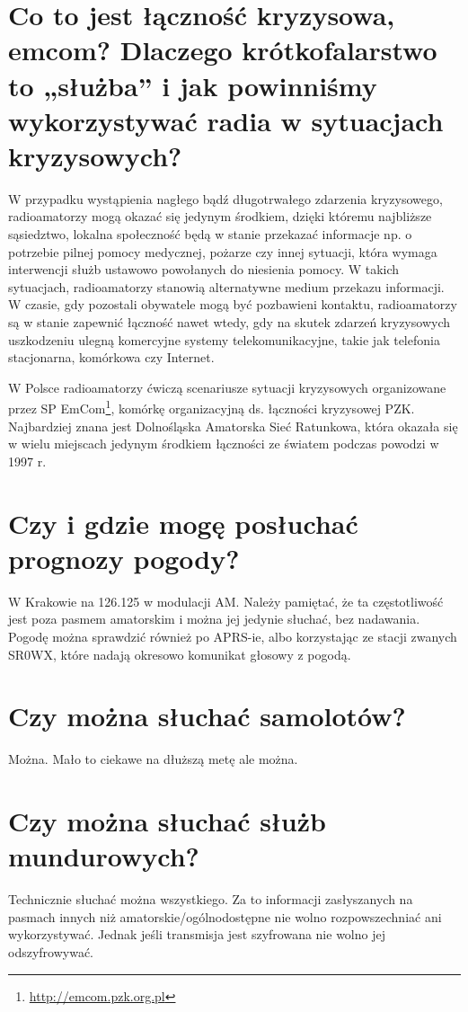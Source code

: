 \documentclass[a4paper,12pt]{article}
\begin{document}
\section{Co to jest łączność kryzysowa, emcom? Dlaczego krótkofalarstwo to „służba” i jak powinniśmy wykorzystywać radia w sytuacjach kryzysowych?}
W przypadku wystąpienia nagłego bądź długotrwałego zdarzenia kryzysowego, radioamatorzy mogą okazać się jedynym środkiem, dzięki któremu najbliższe sąsiedztwo, lokalna społeczność będą w stanie przekazać informacje np. o potrzebie pilnej pomocy medycznej, pożarze czy innej sytuacji, która wymaga interwencji służb ustawowo powołanych do niesienia pomocy. W takich sytuacjach, radioamatorzy stanowią alternatywne medium przekazu informacji. W czasie, gdy pozostali obywatele mogą być pozbawieni kontaktu, radioamatorzy są w stanie zapewnić łączność nawet wtedy, gdy na skutek zdarzeń kryzysowych uszkodzeniu ulegną komercyjne systemy telekomunikacyjne, takie jak telefonia stacjonarna, komórkowa czy Internet. 

W Polsce radioamatorzy ćwiczą scenariusze sytuacji kryzysowych organizowane przez SP EmCom\footnote{\url{http://emcom.pzk.org.pl}}, komórkę organizacyjną ds. łączności kryzysowej PZK. Najbardziej znana jest Dolnośląska Amatorska Sieć Ratunkowa, która okazała się w wielu miejscach jedynym środkiem łączności ze 
światem podczas powodzi w 1997 r.

\section{Czy i gdzie mogę posłuchać prognozy pogody?}
W Krakowie na 126.125 w modulacji AM. Należy pamiętać, że ta częstotliwość jest poza pasmem amatorskim i można jej jedynie słuchać, bez nadawania.
Pogodę można sprawdzić również po APRS-ie, albo korzystając ze stacji zwanych SR0WX, które nadają okresowo komunikat głosowy z pogodą.

\section{Czy można słuchać samolotów?}
Można. Mało to ciekawe na dłuższą metę ale można.

\section{Czy można słuchać służb mundurowych?}
Technicznie słuchać można wszystkiego. Za to informacji zasłyszanych na pasmach innych niż amatorskie/ogólnodostępne nie wolno rozpowszechniać ani wykorzystywać. Jednak jeśli transmisja jest szyfrowana nie wolno jej odszyfrowywać.
\end{document}
